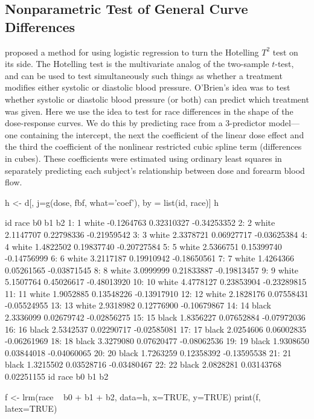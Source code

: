 \subsection{Nonparametric Test of General Curve Differences}\ipacue
\citet{obr88com} proposed a method for using logistic regression to
turn the Hotelling $T^2$ test on its side.  The Hotelling test is the
multivariate analog of the two-sample $t$-test, and can be used to
test simultaneously such things as whether a treatment modifies either
systolic or diastolic blood pressure.  O'Brien's idea was to test
whether systolic or diastolic blood pressure (or both) can predict
which treatment was given.  Here we use the idea to test for race
differences in the shape of the dose-response curves.  We do this by
predicting race from a 3-predictor model---one containing the intercept, the next the coefficient of the linear dose effect and the third the coefficient of the nonlinear restricted cubic spline term (differences in cubes).
These coefficients were estimated
using ordinary least squares in separately predicting each subject's relationship
between dose and forearm blood flow.
\begin{Schunk}
\begin{Sinput}
h <- d[, j=g(dose, fbf, what='coef'), by = list(id, race)]
h
\end{Sinput}
\begin{Soutput}
    id  race         b0         b1          b2
 1:  1 white -0.1264763 0.32310327 -0.34253352
 2:  2 white  2.1147707 0.22798336 -0.21959542
 3:  3 white  2.3378721 0.06927717 -0.03625384
 4:  4 white  1.4822502 0.19837740 -0.20727584
 5:  5 white  2.5366751 0.15399740 -0.14756999
 6:  6 white  3.2117187 0.19910942 -0.18650561
 7:  7 white  1.4264366 0.05261565 -0.03871545
 8:  8 white  3.0999999 0.21833887 -0.19813457
 9:  9 white  5.1507764 0.45026617 -0.48013920
10: 10 white  4.4778127 0.23853904 -0.23289815
11: 11 white  1.9052885 0.13548226 -0.13917910
12: 12 white  2.1828176 0.07558431 -0.05524955
13: 13 white  2.9318982 0.12776900 -0.10679867
14: 14 black  2.3336099 0.02679742 -0.02856275
15: 15 black  1.8356227 0.07652884 -0.07972036
16: 16 black  2.5342537 0.02290717 -0.02585081
17: 17 black  2.0254606 0.06002835 -0.06261969
18: 18 black  3.3279080 0.07620477 -0.08062536
19: 19 black  1.9308650 0.03844018 -0.04060065
20: 20 black  1.7263259 0.12358392 -0.13595538
21: 21 black  1.3215502 0.03528716 -0.03480467
22: 22 black  2.0828281 0.03143768  0.02251155
    id  race         b0         b1          b2
\end{Soutput}
\end{Schunk}
\begin{Sinput}
f <- lrm(race ~ b0 + b1 + b2, data=h, x=TRUE, y=TRUE)
print(f, latex=TRUE)
\end{Sinput}

